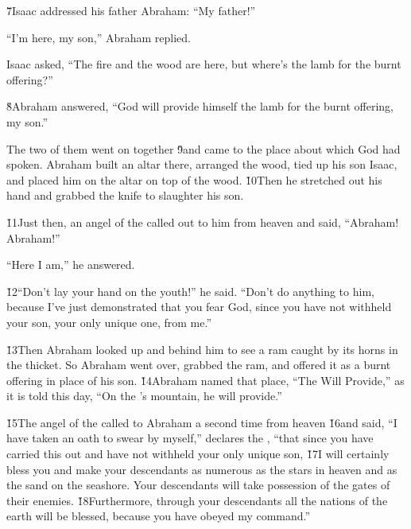 \v{7}Isaac addressed his father Abraham: ``My father!''

``I'm here, my son,'' Abraham replied.

Isaac asked, ``The fire and the wood are here, but where's the lamb for the burnt offering?''

\v{8}Abraham answered, ``God will provide himself the lamb for the burnt offering, my son.''

The two of them went on together \v{9}and came to the place about which God had spoken. Abraham built an altar there, arranged the wood, tied up his son Isaac, and placed him on the altar on top of the wood. \v{10}Then he stretched out his hand and grabbed the knife to slaughter his son.

\v{11}Just then, an angel of the  called out to him from heaven and said, ``Abraham! Abraham!''

``Here I am,'' he answered.

\v{12}``Don't lay your hand on the youth!'' he said. ``Don't do anything to him, because I've just demonstrated that you fear God, since you have not withheld your son, your only unique one, from me.''

\v{13}Then Abraham looked up and behind him to see a ram caught by its horns in the thicket. So Abraham went over, grabbed the ram, and offered it as a burnt offering in place of his son. \v{14}Abraham named that place, ``The  Will Provide,'' as it is told this day, ``On the 's mountain, he will provide.''

\v{15}The angel of the  called to Abraham a second time from heaven \v{16}and said, ``I have taken an oath to swear by myself,'' declares the , ``that since you have carried this out and have not withheld your only unique son, \v{17}I will certainly bless you and make your descendants as numerous as the stars in heaven and as the sand on the seashore. Your descendants will take possession of the gates of their enemies. \v{18}Furthermore, through your descendants all the nations of the earth will be blessed, because you have obeyed my command.''

